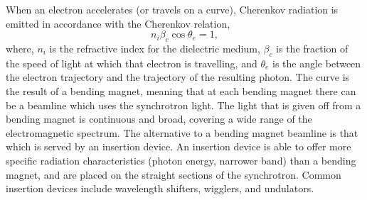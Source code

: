 When an electron accelerates (or travels on a curve), Cherenkov radiation is emitted in accordance with the Cherenkov relation,
%
\begin{equation}
    n_i\beta_c\cos{\theta_e} = 1,
\end{equation}
%
where, $n_i$ is the refractive index for the dielectric medium, $\beta_c$ is the fraction of the speed of light at which that electron is travelling, and $\theta_e$ is the angle between the electron trajectory and the trajectory of the resulting photon.\autocite{garcia-gutierrez_bases_2009}
The curve is the result of a bending magnet, meaning that at each bending magnet there can be a beamline which uses the synchrotron light.
The light that is given off from a bending magnet is continuous and broad, covering a wide range of the electromagnetic spectrum.
The alternative to a bending magnet beamline is that which is served by an insertion device.
An insertion device is able to offer more specific radiation characteristics (photon energy, narrower band) than a bending magnet, and are placed on the straight sections of the synchrotron.
Common insertion devices include wavelength shifters, wigglers, and undulators.

